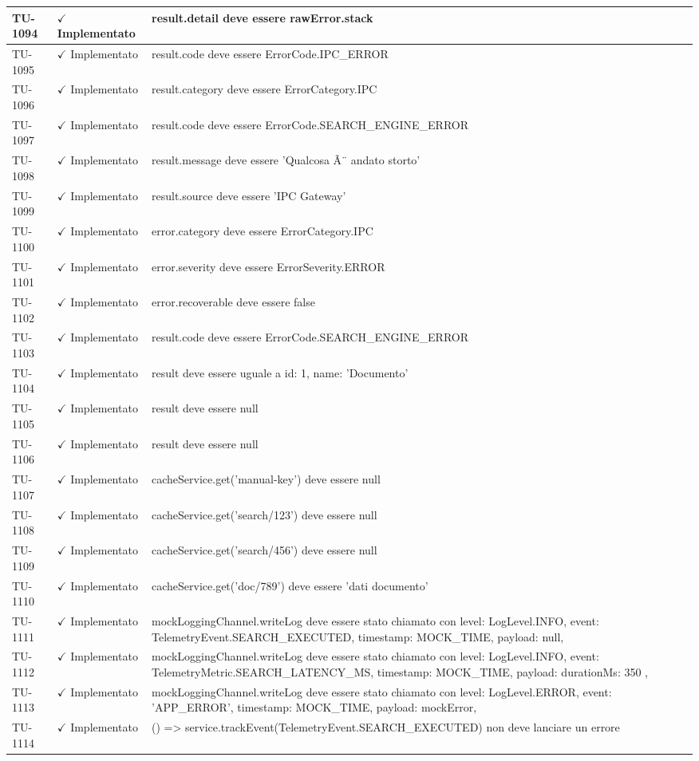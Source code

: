﻿\documentclass[a4paper,12pt]{article}
\newcommand{\ok}{\textcolor{green!60!black}{$\checkmark$ Implementato}}
\begin{document}
\begin{longtable}{|p{2cm}|p{3.5cm}|p{9.5cm}|}
\hline
TU-1094 & \ok & result.detail deve essere rawError.stack \\
\hline
TU-1095 & \ok & result.code deve essere ErrorCode.IPC\_ERROR \\
\hline
TU-1096 & \ok & result.category deve essere ErrorCategory.IPC \\
\hline
TU-1097 & \ok & result.code deve essere ErrorCode.SEARCH\_ENGINE\_ERROR \\
\hline
TU-1098 & \ok & result.message deve essere 'Qualcosa Ã¨ andato storto' \\
\hline
TU-1099 & \ok & result.source deve essere 'IPC Gateway' \\
\hline
TU-1100 & \ok & error.category deve essere ErrorCategory.IPC \\
\hline
TU-1101 & \ok & error.severity deve essere ErrorSeverity.ERROR \\
\hline
TU-1102 & \ok & error.recoverable deve essere false \\
\hline
TU-1103 & \ok & result.code deve essere ErrorCode.SEARCH\_ENGINE\_ERROR \\
\hline
TU-1104 & \ok & result deve essere uguale a { id: 1, name: 'Documento' } \\
\hline
TU-1105 & \ok & result deve essere null \\
\hline
TU-1106 & \ok & result deve essere null \\
\hline
TU-1107 & \ok & cacheService.get('manual-key') deve essere null \\
\hline
TU-1108 & \ok & cacheService.get('search/123') deve essere null \\
\hline
TU-1109 & \ok & cacheService.get('search/456') deve essere null \\
\hline
TU-1110 & \ok & cacheService.get('doc/789') deve essere 'dati documento' \\
\hline
TU-1111 & \ok & mockLoggingChannel.writeLog deve essere stato chiamato con { level: LogLevel.INFO, event: TelemetryEvent.SEARCH\_EXECUTED, timestamp: MOCK\_TIME, payload: null, } \\
\hline
TU-1112 & \ok & mockLoggingChannel.writeLog deve essere stato chiamato con { level: LogLevel.INFO, event: TelemetryMetric.SEARCH\_LATENCY\_MS, timestamp: MOCK\_TIME, payload: { durationMs: 350 }, } \\
\hline
TU-1113 & \ok & mockLoggingChannel.writeLog deve essere stato chiamato con { level: LogLevel.ERROR, event: 'APP\_ERROR', timestamp: MOCK\_TIME, payload: mockError, } \\
\hline
TU-1114 & \ok & () => service.trackEvent(TelemetryEvent.SEARCH\_EXECUTED) non deve lanciare un errore \\

\end{longtable}
\end{document}
